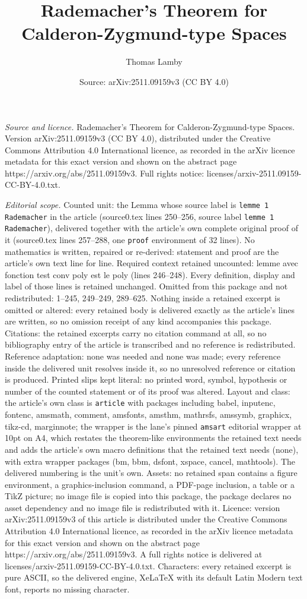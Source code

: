 \documentclass[10pt,a4paper]{amsart}
\title[Rademacher's Theorem for Calderon-Zygmund-type Spaces]{Rademacher's Theorem for Calderon-Zygmund-type Spaces}
\author{Thomas Lamby}
\date{Source: arXiv:2511.09159v3 (CC BY 4.0)}
\begin{document}
\maketitle

\noindent\emph{Source and licence.} Rademacher's Theorem for Calderon-Zygmund-type Spaces. Version arXiv:2511.09159v3 (CC BY 4.0), distributed under the Creative Commons Attribution 4.0 International licence, as recorded in the arXiv licence metadata for this exact version and shown on the abstract page https://arxiv.org/abs/2511.09159v3. Full rights notice: licenses/arxiv-2511.09159-CC-BY-4.0.txt.\par\smallskip

\noindent\textit{Editorial scope.} Counted unit: the Lemma whose source label is \texttt{lemme 1 Rademacher} in the article (source0.tex lines 250--256, source label \texttt{lemme 1 Rademacher}), delivered together with the article's own complete original proof of it (source0.tex lines 257--288, one \texttt{proof} environment of 32 lines). No mathematics is written, repaired or re-derived: statement and proof are the article's own text line for line. Required context retained uncounted: lemme avec fonction test conv poly est le poly (lines 246--248). Every definition, display and label of those lines is retained unchanged. Omitted from this package and not redistributed: 1--245, 249--249, 289--625. Nothing inside a retained excerpt is omitted or altered: every retained body is delivered exactly as the article's lines are written, so no omission receipt of any kind accompanies this package. Citations: the retained excerpts carry no citation command at all, so no bibliography entry of the article is transcribed and no reference is redistributed. Reference adaptation: none was needed and none was made; every reference inside the delivered unit resolves inside it, so no unresolved reference or citation is produced. Printed slips kept literal: no printed word, symbol, hypothesis or number of the counted statement or of its proof was altered. Layout and class: the article's own class is \texttt{article} with packages including babel, inputenc, fontenc, amsmath, comment, amsfonts, amsthm, mathrsfs, amssymb, graphicx, tikz-cd, marginnote; the wrapper is the lane's pinned \texttt{amsart} editorial wrapper at 10pt on A4, which restates the theorem-like environments the retained text needs and adds the article's own macro definitions that the retained text needs (none), with extra wrapper packages (bm, bbm, dsfont, xspace, cancel, mathtools). The delivered numbering is the unit's own. Assets: no retained span contains a figure environment, a graphics-inclusion command, a PDF-page inclusion, a table or a TikZ picture; no image file is copied into this package, the package declares no asset dependency and no image file is redistributed with it. Licence: version arXiv:2511.09159v3 of this article is distributed under the Creative Commons Attribution 4.0 International licence, as recorded in the arXiv licence metadata for this exact version and shown on the abstract page https://arxiv.org/abs/2511.09159v3. A full rights notice is delivered at licenses/arxiv-2511.09159-CC-BY-4.0.txt. Characters: every retained excerpt is pure ASCII, so the delivered engine, XeLaTeX with its default Latin Modern text font, reports no missing character.
\end{document}
